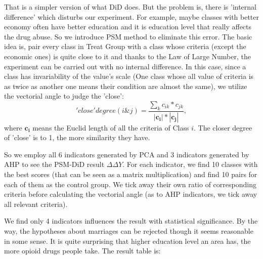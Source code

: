 \documentclass{mcmthesis}
\begin{document}
That is a simpler version of what DiD does. But the problem is, there is 'internal difference' which disturbs our experiment. For example, maybe classes with better economy often have better education and it is education level that really affects the drug abuse. So we introduce PSM method to eliminate this error. The basic idea is, pair every class in Treat Group with a class whose criteria (except the economic ones) is quite close to it and thanks to the Law of Large Number, the experiment can be carried out with no internal difference. In this case, since a class has  invariability of the value's scale (One class whose all value of criteria is as twice as another one means their condition are almost the same), we utilize the vectorial angle to judge the 'close':
$$'close'degree (i \& j)=\dfrac{\sum_k c_{ik}*c_{jk}}{\mathbf{|c_i|*|c_j|}},$$
where $\mathbf{c_i}$ means the Euclid length of all the criteria of Class $i$. The closer degree of 'close' is to 1, the more similarity they have.

So we employ all 6 indicators generated by PCA and 3 indicators generated by AHP to see the PSM-DiD result $\Delta\Delta Y$. For each indicator, we find 10 classes with the best scores (that can be seen as a matrix multiplication) and find 10 pairs for each of them as the control group. We tick away their own ratio of corresponding criteria before calculating the vectorial angle (as to AHP indicators, we tick away all relevant criteria). 

We find only 4 indicators influences the result with statistical significance. By the way, the hypotheses about marriages can be rejected though it seems reasonable in some sense. It is quite surprising that higher education level an area has, the more opioid drugs people take. The result table is:
\end{document}
